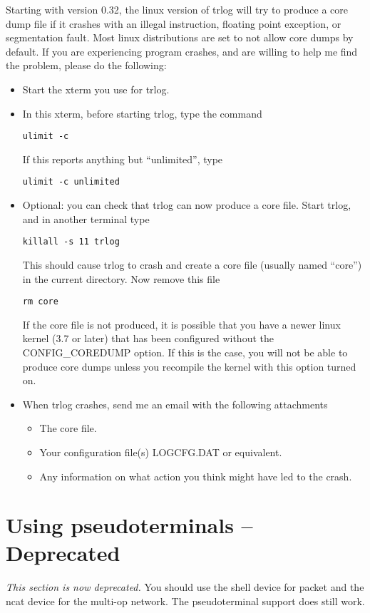\documentclass[12pt]{article}
\begin{document}
Starting with version 0.32, the linux version of trlog will try to produce
a core dump file
if it crashes with an illegal instruction, floating
point exception, or segmentation fault. Most linux distributions are
set to not allow core dumps by default. If you are experiencing program
crashes, and are willing to help me find the problem, please do the following:
\begin{itemize}
\item
Start the xterm you use for trlog.
\item
In this xterm, before starting trlog, type the command
\begin{verbatim}
ulimit -c
\end{verbatim}
If this reports anything but ``unlimited'', type
\begin{verbatim}
ulimit -c unlimited
\end{verbatim}
\item
Optional:
you
can check that trlog can now produce a core file. Start trlog, and in
another terminal type
\begin{verbatim}
killall -s 11 trlog
\end{verbatim}
This should cause trlog to crash and create a core file (usually named
``core'') in the current directory.
Now remove this file
\begin{verbatim}
rm core
\end{verbatim}
If the core file is not produced, it is possible that you have a newer
linux kernel (3.7 or later) that has been configured without the
CONFIG\_COREDUMP option. If this is the case, you will not be able to
produce core dumps unless you recompile the kernel with this option turned
on.
\item
When trlog crashes, send me an email with the following attachments
\begin{itemize}
\item
The core file.
\item
Your configuration file(s) LOGCFG.DAT or equivalent.
\item
Any information on what action you think might have led to the crash.
\end{itemize}
\end{itemize}

\section{Using pseudoterminals -- Deprecated}
{\em This section is now deprecated.} You should use the shell device
for packet and the ncat device for the multi-op network. The pseudoterminal
support does still work.
\end{document}
